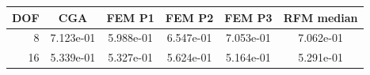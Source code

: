 \begin{tabular}{rccccc}
\toprule
DOF & CGA & FEM P1 & FEM P2 & FEM P3 & RFM median \\
\midrule
8 & 7.123e-01 & 5.988e-01 & 6.547e-01 & 7.053e-01 & 7.062e-01 \\
16 & 5.339e-01 & 5.327e-01 & 5.624e-01 & 5.164e-01 & 5.291e-01 \\
\bottomrule
\end{tabular}
